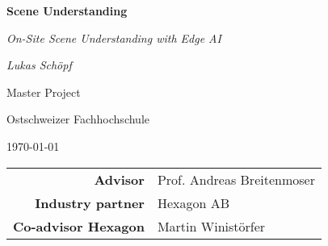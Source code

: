 %
%
%


\begin{titlepage}
    \centering

    {\huge \bfseries \sffamily Scene Understanding \par
     \normalfont\itshape On-Site Scene Understanding with Edge AI \par}
    \vspace{1cm}

    {\large \textsl{Lukas Schöpf}}
    \par
    \vspace{1cm}

    {\textsc Master Project \par}
    {Ostschweizer Fachhochschule \par}
    \today
    \vfill
    

    \vfill

    \begin{tabular}{rl}
        \bfseries\sffamily Advisor              & Prof. Andreas Breitenmoser \\
        \bfseries\sffamily Industry partner     & Hexagon AB \\
        \bfseries\sffamily Co-advisor Hexagon   & Martin Winistörfer \\
    \end{tabular}
    \restoregeometry    
\end{titlepage}

